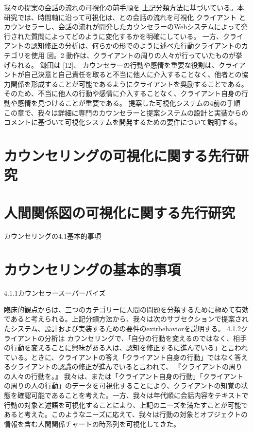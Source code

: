 \documentclass[shuuron]{kuee}
\begin{document}
我々の提案の会話の流れの可視化の前手順を 上記分類方法に基づいている。本研究では、時間軸に沿って可視化は、との会話の流れを可視化 クライアント とカウンセラーし、会話の流れが開発したカウンセラーのWebシステムによって発行された質問によってどのように変化するかを明確にしている。
一方、クライアントの認知修正の分析は、何らかの形でのように述べた行動クライアントのカテゴリを使用 図。2 動作は、クライアントの周りの人々が行っていたものが挙げられる。 鎌田は [12]、 カウンセラーの行動や感情を重要な役割は、クライアントが自己決意と自己責任を取ると不当に他人に介入することなく、他者との協力関係を形成することが可能であるようにクライアントを奨励することである。そのため、不当に他人の行動や感情に介入することなく、クライアント自身の行動や感情を見つけることが重要である。
提案した可視化システムの4前の手順
 この章で、我々は詳細に専門のカウンセラーと提案システムの設計と実装からのコメントに基づいて可視化システムを開発するための要件について説明する。

\section{カウンセリングの可視化に関する先行研究}

\section{人間関係図の可視化に関する先行研究}

カウンセリングの4.1基本的事項

\section{カウンセリングの基本的事項}
4.1.1カウンセラースーパーバイズ

 臨床的観点からは、三つのカテゴリーに人間の問題を分類するために極めて有効であると考えられる。上記分類方法から、我々は次のサブセクションで提案されたシステム、設計および実装するための要件のextrbehaviorを説明する。
4.1.2クライアントの分析は
 カウンセリングで、「自分の行動を変えるのではなく、相手の行動を変えることに興味がある人は、認知を修正するに進んでいる」と言われている。ときに、クライアントの答え「クライアント自身の行動」ではなく答えるクライアントの認識の修正が進んでいると言われて、 『クライアントの周りの人々の行動を。』
 我々は、または「クライアント自身の行動」「クライアントの周りの人の行動」のデータを可視化することにより、クライアントの知覚の状態を確認可能であることを考えた。一方、我々は年代順に会話内容をテキストで行動の対象と述語を可視化することにより、上記のニーズを満たすことが可能であると考えた。このようなニーズに応えて、我々は行動の対象とオブジェクトの情報を含む人間関係チャートの時系列を可視化してきた。
\end{document}
